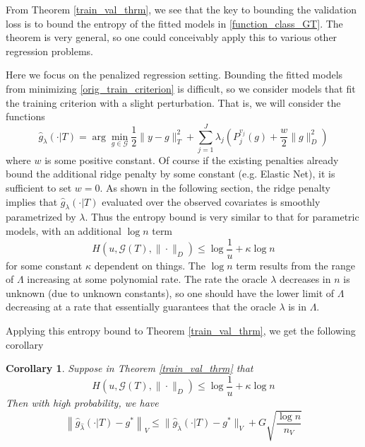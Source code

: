 \documentclass[12pt]{article}
\newtheorem{corollary}{Corollary}
\begin{document}
From Theorem \ref{train_val_thrm}, we see that the key to bounding the validation loss is to bound the entropy of the fitted models in \eqref{function_class_GT}. The theorem is very general, so one could conceivably apply this to various other regression problems.

Here we focus on the penalized regression setting. Bounding the fitted models from minimizing \eqref{orig_train_criterion} is difficult, so we consider models that fit the training criterion with a slight perturbation. That is, we will consider the functions
\begin{equation}
\hat{g}_\lambda(\cdot | T) = \arg\min_{g\in\mathcal{G}} \frac{1}{2} \| y-g \|_{T}^{2} + \sum_{j=1}^J \lambda_j \left ( P_j^{v_j}(g) + \frac{w}{2} \| g \|_D^2 \right )
\end{equation}
where $w$ is some positive constant. Of course if the existing penalties already bound the additional ridge penalty by some constant (e.g. Elastic Net), it is sufficient to set $w=0$. As shown in the following section, the ridge penalty implies that $\hat{g}_\lambda(\cdot | T)$ evaluated over the observed covariates is smoothly parametrized by $\lambda$. Thus the entropy bound is very similar to that for parametric models, with an additional $\log n$ term
\begin{equation}
\label{entropy_bound}
H(u, \mathcal{G}(T), \| \cdot \|_D) \le \log \frac{1}{u} + \kappa \log n
\end{equation}
for some constant $\kappa$ dependent on things. The $\log n$ term results from the range of $\Lambda$ increasing at some polynomial rate. The rate the oracle $\lambda$ decreases in $n$ is unknown (due to unknown constants), so one should have the lower limit of $\Lambda$ decreasing at a rate that essentially guarantees that the oracle $\lambda$ is in $\Lambda$.

Applying this entropy bound to Theorem \ref{train_val_thrm}, we get the following corollary
\begin{corollary}
\label{train_val_corr}
Suppose in Theorem \ref{train_val_thrm} that
\begin{equation}
H(u, \mathcal{G}(T), \| \cdot \|_D) \le \log \frac{1}{u} + \kappa \log n
\end{equation}
Then with high probability, we have
\begin{equation}
\label{error_bound}
\left \|\hat{g}_{\hat{\lambda} }(\cdot | T) - g^* \right \|_V
\le 
\| \hat{g}_{\tilde{\lambda}}(\cdot | T) - g^*\|_V + G \sqrt{\frac{\log n}{n_V}}
\end{equation}
\end{corollary}
\end{document}
